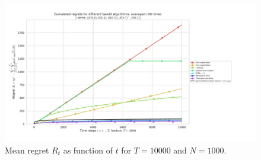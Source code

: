 \begin{figure}[h!]  %
	\includegraphics[width=1.12\linewidth]{SP__K5_T10000_N1000__7_algos/main____env1-1_2506036032481767447.pdf}
	\caption{Mean regret $R_t$ as function of $t$ for $T=10000$ and $N=1000$.}
	\label{fig:2:meanRegretAsFunctionOfTimeForDifferentAlgorithmsT10000N1000}
\end{figure}

\newpage





